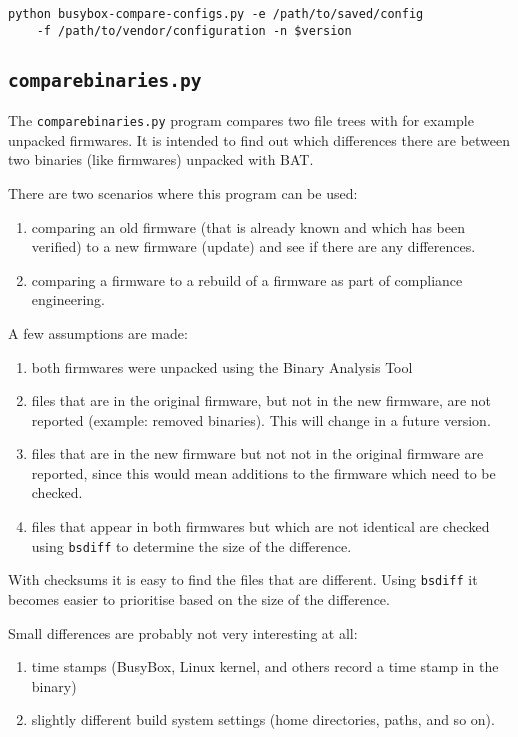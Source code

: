 \documentclass[10pt]{article}
\begin{document}
\begin{verbatim}
python busybox-compare-configs.py -e /path/to/saved/config
    -f /path/to/vendor/configuration -n $version
\end{verbatim}

\subsection{\texttt{comparebinaries.py}}

The \texttt{comparebinaries.py} program compares two file trees with for example
unpacked firmwares. It is intended to find out which differences there are
between two binaries (like firmwares) unpacked with BAT.

There are two scenarios where this program can be used:

\begin{enumerate}
\item comparing an old firmware (that is already known and which has been
verified) to a new firmware (update) and see if there are any differences.
\item comparing a firmware to a rebuild of a firmware as part of compliance
engineering.
\end{enumerate}

A few assumptions are made:

\begin{enumerate}
\item both firmwares were unpacked using the Binary Analysis Tool
\item files that are in the original firmware, but not in the new firmware, are
not reported (example: removed binaries). This will change in a future version.
\item files that are in the new firmware but not not in the original firmware are
reported, since this would mean additions to the firmware which need to be
checked.
\item files that appear in both firmwares but which are not identical are
checked using \texttt{bsdiff} to determine the size of the difference.
\end{enumerate}

With checksums it is easy to find the files that are different. Using
\texttt{bsdiff} it becomes easier to prioritise based on the size of the
difference.

Small differences are probably not very interesting at all:

\begin{enumerate}
\item time stamps (BusyBox, Linux kernel, and others record a time stamp in the
binary)
\item slightly different build system settings (home directories, paths, and
so on).
\end{enumerate}
\end{document}
